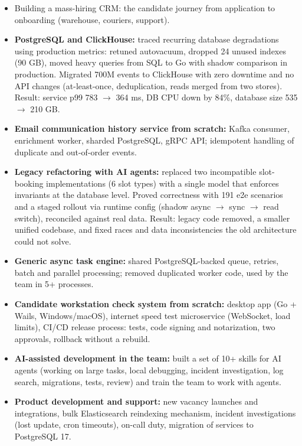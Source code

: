 \documentclass{dodiresume}
\begin{document}
\begin{itemize}
\item Building a mass-hiring CRM: the candidate journey from application to onboarding (warehouse, couriers, support).
\item \textbf{PostgreSQL and ClickHouse:} traced recurring database degradations using production metrics: retuned autovacuum, dropped 24 unused indexes (90 GB), moved heavy queries from SQL to Go with shadow comparison in production. Migrated 700M events to ClickHouse with zero downtime and no API changes (at-least-once, deduplication, reads merged from two stores). Result: service p99 783 $\to$ 364 ms, DB CPU down by 84\%, database size 535 $\to$ 210 GB.
\item \textbf{Email communication history service from scratch:} Kafka consumer, enrichment worker, sharded PostgreSQL, gRPC API; idempotent handling of duplicate and out-of-order events.
\item \textbf{Legacy refactoring with AI agents:} replaced two incompatible slot-booking implementations (6 slot types) with a single model that enforces invariants at the database level. Proved correctness with 191 e2e scenarios and a staged rollout via runtime config (shadow async $\to$ sync $\to$ read switch), reconciled against real data. Result: legacy code removed, a smaller unified codebase, and fixed races and data inconsistencies the old architecture could not solve.
\item \textbf{Generic async task engine:} shared PostgreSQL-backed queue, retries, batch and parallel processing; removed duplicated worker code, used by the team in 5+ processes.
\item \textbf{Candidate workstation check system from scratch:} desktop app (Go + Wails, Windows/macOS), internet speed test microservice (WebSocket, load limits), CI/CD release process: tests, code signing and notarization, two approvals, rollback without a rebuild.
\item \textbf{AI-assisted development in the team:} built a set of 10+ skills for AI agents (working on large tasks, local debugging, incident investigation, log search, migrations, tests, review) and train the team to work with agents.
\item \textbf{Product development and support:} new vacancy launches and integrations, bulk Elasticsearch reindexing mechanism, incident investigations (lost update, cron timeouts), on-call duty, migration of services to PostgreSQL 17.
\end{itemize}
\end{document}
